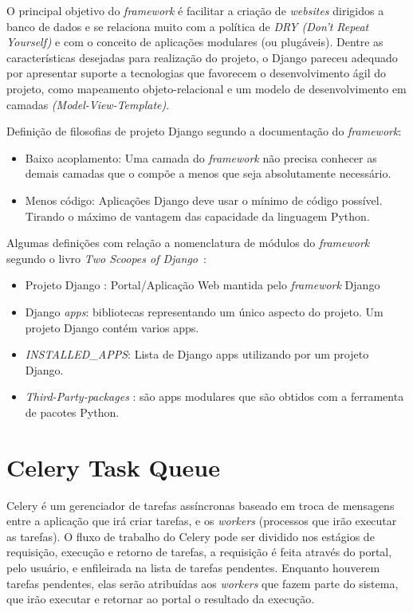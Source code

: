 \documentclass[tg]{mdtufsm}
\begin{document}
O principal objetivo do \emph{framework} é facilitar a criação de \emph{websites} dirigidos a banco de dados e se relaciona muito com a política de \emph{DRY (Don't Repeat Yourself)} e com o conceito de aplicações modulares (ou plugáveis). Dentre as características desejadas para realização do projeto, o Django pareceu adequado por apresentar suporte a tecnologias que favorecem o desenvolvimento ágil do projeto, como mapeamento objeto-relacional e um modelo de desenvolvimento em camadas \emph{(Model-View-Template)}.

Definição de filosofias de projeto Django segundo a documentação do \emph{framework}:
\begin{itemize}
	\item Baixo acoplamento: Uma camada do \emph{framework} não precisa conhecer as demais camadas que o compõe a menos que seja absolutamente necessário. 
	\item Menos código: Aplicações Django deve usar o mínimo de código possível. Tirando o máximo de vantagem das capacidade da linguagem Python.
\end{itemize}

Algumas definições com relação a nomenclatura de módulos do \emph{framework} segundo o livro \textit{Two Scoopes of Django}~\cite{twoscoopes}:
\begin{itemize}
	\item  Projeto Django : Portal/Aplicação Web mantida pelo \emph{framework} Django
	\item  Django\emph{ apps}: bibliotecas representando um único aspecto do projeto. Um projeto Django contém varios apps.
	\item \emph{INSTALLED\_APPS}: Lista de Django apps utilizando por um projeto Django.
	\item \emph{Third-Party-packages} : são apps modulares que são obtidos com a ferramenta de pacotes Python.
\end{itemize}

\section{Celery Task Queue}
Celery é um gerenciador de tarefas assíncronas baseado em troca de mensagens entre a aplicação que irá criar tarefas, e os \emph{workers} (processos que irão executar as tarefas). O fluxo de trabalho do Celery pode ser dividido nos estágios de requisição, execução e retorno de tarefas, a requisição é feita através do portal, pelo usuário, e enfileirada na lista de tarefas pendentes. Enquanto houverem tarefas pendentes, elas serão atribuídas aos \emph{workers} que fazem parte do sistema, que irão executar e retornar ao portal o resultado da execução.
\end{document}
